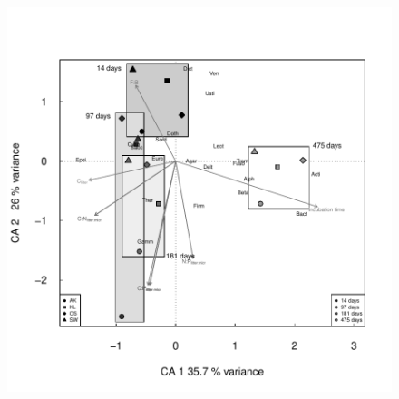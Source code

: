 \documentclass[10pt]{article}
\begin{document}
\begin{flushleft}
\newpage
\begin{figure}[h!]
\vspace*{2mm}
\begin{center}
\includegraphics{ligpaper-metaprot_pca}
\end{center}
\end{figure}


\end{flushleft}
\end{document}
